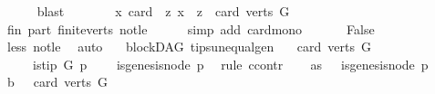 \begin{isabellebody}
\ \ \ \ \isamarkupfalse%
\ blast\ \isanewline
\ \ \isamarkupfalse%
\isanewline
\ \ \isamarkupfalse%
\ {\isachardoublequoteopen}{\isasymforall}x{\isachardot}{\kern0pt}\ card\ \ {\isacharbraceleft}{\kern0pt}z{\isachardot}{\kern0pt}\ x\ {\isasymrightarrow}\isactrlsup {\isacharplus}{\kern0pt}\ z{\isacharbraceright}{\kern0pt}\ {\isasymle}\ card\ {\isacharparenleft}{\kern0pt}verts\ G{\isacharparenright}{\kern0pt}{\isachardoublequoteclose}\isanewline
\ \ \ \ \isamarkupfalse%
\ fin\ part\ finite{\isacharunderscore}{\kern0pt}verts\ not{\isacharunderscore}{\kern0pt}le\isanewline
\ \ \ \ \isamarkupfalse%
\ {\isacharparenleft}{\kern0pt}simp\ add{\isacharcolon}{\kern0pt}\ card{\isacharunderscore}{\kern0pt}mono{\isacharparenright}{\kern0pt}\ \isanewline
\ \ \isamarkupfalse%
\ \isamarkupfalse%
\ False\isanewline
\ \ \ \ \isamarkupfalse%
\ less\ not{\isacharunderscore}{\kern0pt}le\ \isamarkupfalse%
\ auto\ \isanewline
{}\isamarkupfalse%
%
\endisatagproof
{\isafoldproof}%
%
\isadelimproof
\isanewline
%
\endisadelimproof
\isanewline
{}\isamarkupfalse%
\ {\isacharparenleft}{\kern0pt}\ blockDAG{\isacharparenright}{\kern0pt}\ tips{\isacharunderscore}{\kern0pt}unequal{\isacharunderscore}{\kern0pt}gen{\isacharcolon}{\kern0pt}\isanewline
\ \ \ {\isachardoublequoteopen}card{\isacharparenleft}{\kern0pt}\ verts\ G{\isacharparenright}{\kern0pt}\ {\isachargreater}{\kern0pt}\ {}{\isachardoublequoteclose}\isanewline
\ \ \ \ \ {\isachardoublequoteopen}is{\isacharunderscore}{\kern0pt}tip\ G\ p{\isachardoublequoteclose}\isanewline
\ \ \ {\isachardoublequoteopen}{\isasymnot}\ is{\isacharunderscore}{\kern0pt}genesis{\isacharunderscore}{\kern0pt}node\ p\ {\isachardoublequoteclose}\isanewline
%
\isadelimproof
%
\endisadelimproof
%
\isatagproof
{}\isamarkupfalse%
\ {\isacharparenleft}{\kern0pt}rule\ ccontr{\isacharparenright}{\kern0pt}\isanewline
\ \ \isamarkupfalse%
\ as{\isacharcolon}{\kern0pt}\ {\isachardoublequoteopen}{\isasymnot}\ {\isasymnot}\ is{\isacharunderscore}{\kern0pt}genesis{\isacharunderscore}{\kern0pt}node\ p{\isachardoublequoteclose}\isanewline
\ \ \isamarkupfalse%
\ b{}{\isacharcolon}{\kern0pt}\ {\isachardoublequoteopen}{}\ {\isacharless}{\kern0pt}\ card\ {\isacharparenleft}{\kern0pt}verts\ G{\isacharparenright}{\kern0pt}{\isachardoublequoteclose}\ \isamarkupfalse%

\end{isabellebody}

